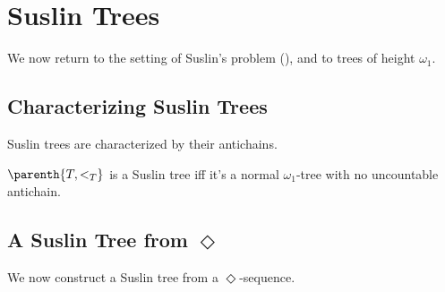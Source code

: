 \section{Suslin Trees} \label{Ch4:Sec:Suslin_Trees}

We now return to the setting of Suslin's problem (), and to trees of height $\omega_1$.

\subsection{Characterizing Suslin Trees}

\sorry

Suslin trees are characterized by their antichains.

\begin{boxlemma}
    $\parenth{T, <_{T}}$ is a Suslin tree iff it's a normal $\omega_1$-tree with no uncountable antichain.
\end{boxlemma}

\subsection{A Suslin Tree from $\Diamond$}

We now construct a Suslin tree from a $\Diamond$-sequence.

